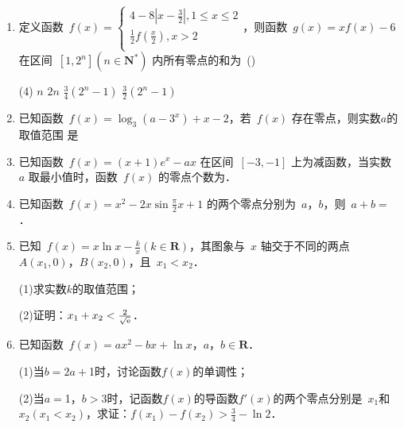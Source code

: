 \documentclass[UTF8,twoside,openright]{ctexbook}
\newcommand{\hfquan}[1]{\raisebox{-0.05em}{\koz\CIDtextblackboxed{#1}}}
\newenvironment{zuoye}{
\begin{enumerate}
[
labelindent=0mm,
align=left,
labelwidth=1.5em,
itemsep=2em,
labelsep=0em,
leftmargin=1.5em,
label={\textcolor{cyan}{\hfquan{\arabic*}}}]
}
{\end{enumerate}}
\begin{document}
\begin{zuoye}
\item 定义函数~$f(x)=
\begin{cases}
 {4-8|x-\frac{3}{2}|,1\leq x\leq 2}  \\
 {\frac{1}{2}f(\frac{x}{2}),x>2}  \\
\end{cases}
$，则函数~$g(x)=xf(x)-6$ 在区间~$[1, 2^{n}](n\in
\mathbf{N}^{\ast})$ 内所有零点的和为~(\quad)
\begin{tasks}(4)
    \task $ n$
    \task $2n$
    \task $ \frac{3}{4}(2^{n}-1)$
    \task $\frac{3}{2}(2^{n}-1) $
\end{tasks}

\item 已知函数~$f(x)=\log_{3}
(a-3^{x})+x-2$，若~$f(x)$ 存在零点，则实数$a$的取值范围
是~\underline{\qquad}

\item 已知函数~$f(x)=(x+1)e^{x}-ax$ 在区间~$[-3,-1]$ 上为减函数，当实数~$a$ 取最小值时，函数~$f(x)$ 的零点个数为\underline{\qquad}．

\item 已知函数~$f(x)=x^{2}-2x\sin \frac{\pi
}{2}x+1$ 的两个零点分别为~$a$，$b$，则~$a+b=$\underline{\qquad}．

\item 已知~$f(x)=x\ln x-\frac{k}{x}(k\in
\mathbf{R})$，其图象与~$x$ 轴交于不同的两点~$A(x_{1} ,0)$，$B(x_{2},0)$，且~$x_{1} <x_{2}$．

(1)求实数$k$的取值范围；

(2)证明：$x_{1} +x_{2} <\frac{2}{\sqrt{{\rm e}}}$．

\item 已知函数~$f(x)=ax^{2}-bx+\ln x$，$a$，$b\in \mathbf{R}$．

(1)当$b=2a+$1时，讨论函数$f(x)$的单调性；

(2)当$a=$1，$b>$3时，记函数$f(x)$的导函数${f}'(x)$的两个零点分别是~$x_{1}
$和~$x_{2} (x_{1} <x_{2} )$，求证：$f(x_{1} )-f(x_{2}
)>\frac{3}{4}-\ln 2$．

\end{zuoye}
\end{document}
